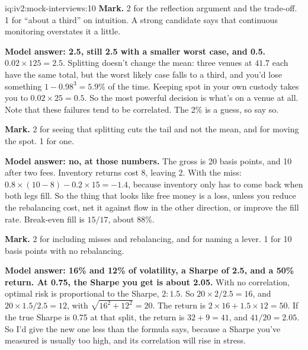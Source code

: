 \begin{solution}{iq:iv2:mock-interviews:10}
\textbf{Mark.} 2 for the reflection argument and the trade-off. 1 for ``about a third'' on intuition. A strong candidate says that continuous monitoring overstates it a little.

\ivstop
\textbf{Model answer: 2.5, still 2.5 with a smaller worst case, and 0.5.} $0.02 \times 125 = 2.5$. Splitting doesn't change the mean: three venues at $41.7$ each have the same total, but the worst likely case falls to a third, and you'd lose something $1 - 0.98^3 = 5.9\%$ of the time. Keeping spot in your own custody takes you to $0.02 \times 25 = 0.5$. So the most powerful decision is what's on a venue at all. Note that these failures tend to be correlated. The 2\% is a guess, so say so.

\textbf{Mark.} 2 for seeing that splitting cuts the tail and not the mean, and for moving the spot. 1 for one.

\ivstop
\textbf{Model answer: no, at those numbers.} The gross is 20 basis points, and 10 after two fees. Inventory returns cost 8, leaving 2. With the miss: $0.8 \times (10 - 8) - 0.2 \times 15 = -1.4$, because inventory only has to come back when both legs fill. So the thing that looks like free money is a loss, unless you reduce the rebalancing cost, net it against flow in the other direction, or improve the fill rate. Break-even fill is $15/17$, about 88\%.

\textbf{Mark.} 2 for including misses and rebalancing, and for naming a lever. 1 for 10 basis points with no rebalancing.

\ivstop
\textbf{Model answer: 16\% and 12\% of volatility, a Sharpe of 2.5, and a 50\% return. At 0.75, the Sharpe you get is about 2.05.} With no correlation, optimal risk is proportional to the Sharpe, $2:1.5$. So $20 \times 2/2.5 = 16$, and $20 \times 1.5/2.5 = 12$, with $\sqrt{16^2 + 12^2} = 20$. The return is $2 \times 16 + 1.5 \times 12 = 50$. If the true Sharpe is 0.75 at that split, the return is $32 + 9 = 41$, and $41/20 = 2.05$. So I'd give the new one less than the formula says, because a Sharpe you've measured is usually too high, and its correlation will rise in stress.


\end{solution}

